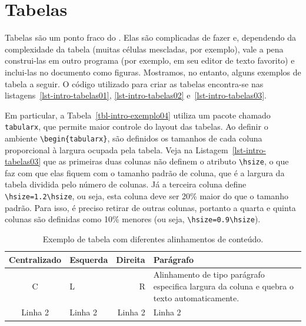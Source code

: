 \section{Tabelas}
\label{sec-intro-tabelas}

Tabelas são um ponto fraco do \latex. Elas são complicadas de fazer e, dependendo da complexidade da tabela (muitas células mescladas, por exemplo), vale a pena construi-las em outro programa (por exemplo, em seu editor de texto favorito) e inclui-las no documento como figuras. Mostramos, no entanto, alguns exemplos de tabela a seguir. O código utilizado para criar as tabelas encontra-se nas listagens~\ref{lst-intro-tabelas01}, \ref{lst-intro-tabelas02} e~\ref{lst-intro-tabelas03}.







Em particular, a Tabela~\ref{tbl-intro-exemplo04} utiliza um pacote chamado \texttt{tabularx}, que permite maior controle do layout das tabelas. Ao definir o ambiente \texttt{\textbackslash begin\{tabularx\}}, são definidos os tamanhos de cada coluna proporcional à largura ocupada pela tabela. Veja na Listagem~\ref{lst-intro-tabelas03} que as primeiras duas colunas não definem o atributo \texttt{\textbackslash hsize}, o que faz com que elas fiquem com o tamanho padrão de coluna, que é a largura da tabela dividida pelo número de colunas. Já a terceira coluna define \texttt{\textbackslash hsize=1.2\textbackslash hsize}, ou seja, esta coluna deve ser 20\% maior do que o tamanho padrão. Para isso, é preciso retirar de outras colunas, portanto a quarta e quinta colunas são definidas como 10\% menores (ou seja, \texttt{\textbackslash hsize=0.9\textbackslash hsize}).

\begin{table}
	\caption{Exemplo de tabela com diferentes alinhamentos de conteúdo.}
	\label{tbl-intro-exemplo01}
	\centering
	\begin{tabular}{ | c | l | r | p{40mm} |}\hline
		\textbf{Centralizado} & \textbf{Esquerda} & \textbf{Direita} & \textbf{Parágrafo}\\\hline
		C & L & R & Alinhamento de tipo parágrafo especifica largura da coluna e quebra o texto automaticamente.\\
		\hline
		Linha 2 & Linha 2 & Linha 2 & Linha 2\\
		\hline
	\end{tabular}
\end{table}

